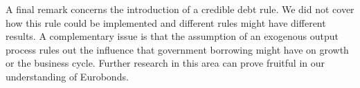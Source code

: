 A final remark concerns the introduction of a credible debt rule. We did not cover how this rule could be implemented and different rules might have different results. A complementary issue is that the assumption of an exogenous output process rules out the influence that government borrowing might have on growth or the business cycle. Further research in this area can prove fruitful in our understanding of Eurobonds.\\ 
